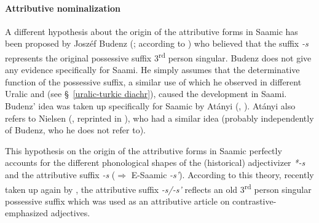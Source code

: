 {
\paragraph{Attributive nominalization}
A different hypothesis about the origin of the attributive forms in Saamic has been proposed by Joszéf Budenz (\citeyear{budenz1870}; according to \citealt{atanyi1942,atanyi1943}) who believed that the suffix \textit{-s} represents the original possessive suffix 3\textsuperscript{rd} person singular. Budenz does not give any evidence specifically for Saami. He simply assumes that the determinative function of the possessive suffix, a similar use of which he observed in different Uralic and  (see \S~\ref{uralic-turkic diachr}), caused the development in Saami. Budenz' idea was taken up specifically for Saamic by Atányi (\citeyear{atanyi1942}, \citeyear{atanyi1943}). Atányi also refers to Nielsen (\citeyear{nielsen1933}, reprinted in \citealt{nielsen1945b}), who had a similar idea (probably independently of Budenz, who he does not refer to).

This hypothesis on the origin of the attributive forms in Saamic perfectly accounts for the different phonological shapes of the (historical) adjectivizer \mbox{\textit{*-s}} and the attributive suffix \textit{-s} ($\Rightarrow$ E-Saamic \textit{-s'}). According to this theory, recently taken up again by \cite{riesler2006b}, the attributive suffix \textit{-s/-s'} reflects an old 3\textsuperscript{rd} person singular possessive suffix which was used as an attributive article on contrastive-emphasized adjectives.

}
